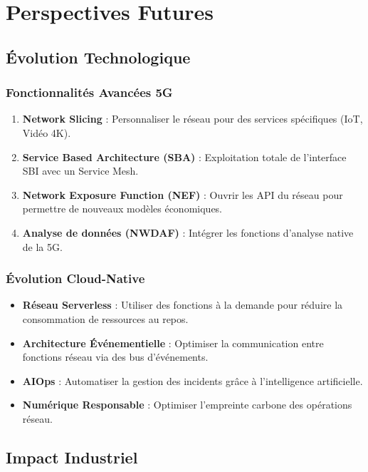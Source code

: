 \documentclass[12pt,a4paper]{report}
\begin{document}
\section{Perspectives Futures}

\subsection{Évolution Technologique}

\subsubsection{Fonctionnalités Avancées 5G}

\begin{enumerate}
    \item \textbf{Network Slicing} : Personnaliser le réseau pour des services spécifiques (IoT, Vidéo 4K).
    \item \textbf{Service Based Architecture (SBA)} : Exploitation totale de l'interface SBI avec un Service Mesh.
    \item \textbf{Network Exposure Function (NEF)} : Ouvrir les API du réseau pour permettre de nouveaux modèles économiques.
    \item \textbf{Analyse de données (NWDAF)} : Intégrer les fonctions d'analyse native de la 5G.
\end{enumerate}

\subsubsection{Évolution Cloud-Native}

\begin{itemize}
    \item \textbf{Réseau Serverless} : Utiliser des fonctions à la demande pour réduire la consommation de ressources au repos.
    \item \textbf{Architecture Événementielle} : Optimiser la communication entre fonctions réseau via des bus d'événements.
    \item \textbf{AIOps} : Automatiser la gestion des incidents grâce à l'intelligence artificielle.
    \item \textbf{Numérique Responsable} : Optimiser l'empreinte carbone des opérations réseau.
\end{itemize}

\subsection{Impact Industriel}
\end{document}
